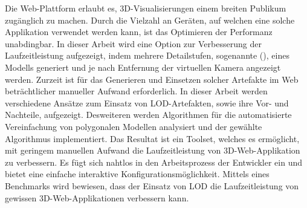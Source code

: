 Die Web-Plattform erlaubt es, 3D-Visualisierungen einem breiten Publikum zugänglich zu machen. Durch die Vielzahl an Geräten, auf welchen eine solche Applikation verwendet werden kann, ist das Optimieren der Performanz unabdingbar. In dieser Arbeit wird eine Option zur Verbesserung der Laufzeitleistung aufgezeigt, indem mehrere Detailstufen, sogenannte  (), eines Modells generiert und je nach Entfernung der virtuellen Kamera angezeigt werden. Zurzeit ist für das Generieren und Einsetzen solcher Artefakte im Web beträchtlicher manueller Aufwand erforderlich.
\bigbreak
In dieser Arbeit werden verschiedene Ansätze zum Einsatz von LOD-Artefakten, sowie ihre Vor- und Nachteile, aufgezeigt.
Desweiteren werden Algorithmen für die automatisierte Vereinfachung von polygonalen Modellen analysiert und der gewählte Algorithmus implementiert.
\bigbreak
Das Resultat ist ein Toolset, welches es ermöglicht, mit geringem manuellen Aufwand die Laufzeitleistung von 3D-Web-Applikation zu verbessern.
Es fügt sich nahtlos in den Arbeitsprozess der Entwickler ein und bietet eine einfache interaktive Konfigurationsmöglichkeit.
Mittels eines Benchmarks wird bewiesen, dass der Einsatz von LOD die Laufzeitleistung von gewissen 3D-Web-Applikationen verbessern kann.

